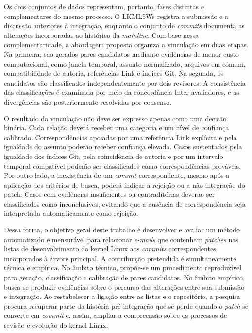 Os dois conjuntos de dados representam, portanto, fases distintas e complementares do mesmo processo. O LKML5Ws registra a submissão e a discussão anteriores à integração, enquanto o conjunto de \textit{commits} documenta as alterações incorporadas ao histórico da \textit{mainline}. Com base nessa complementaridade, a abordagem proposta organiza a vinculação em duas etapas. Na primeira, são gerados pares candidatos mediante evidências de menor custo computacional, como janela temporal, assunto normalizado, arquivos em comum, compatibilidade de autoria, referências Link e índices Git. Na segunda, os candidatos são classificados independentemente por dois revisores. A consistência das classificações é examinada por meio da concordância Inter avaliadores, e as divergências são posteriormente resolvidas por consenso.

O resultado da vinculação não deve ser expresso apenas como uma decisão binária. Cada relação deverá receber uma categoria e um nível de confiança calibrado. Correspondências apoiadas por uma referência Link explícita e pela igualdade do assunto poderão receber confiança elevada. Casos sustentados pela igualdade dos índices Git, pela coincidência de autoria e por um intervalo temporal compatível poderão ser classificados como correspondências prováveis. Por outro lado, a inexistência de um \textit{commit} correspondente, mesmo após a aplicação dos critérios de busca, poderá indicar a rejeição ou a não integração do patch. Casos com evidências insuficientes ou contraditórias deverão ser classificados como inconclusivos, evitando que a ausência de correspondência seja interpretada automaticamente como rejeição.

Dessa forma, o objetivo geral deste trabalho é desenvolver e avaliar um método automatizado e mensurável para relacionar \textit{e-mails} que contenham \textit{patches} nas listas de desenvolvimento do kernel Linux aos \textit{commits} correspondentes incorporados à árvore principal. A contribuição pretendida é simultaneamente técnica e empírica. No âmbito técnico, propõe-se um procedimento reproduzível para geração, classificação e calibração de pares candidatos. No âmbito empírico, busca-se produzir evidências sobre o percurso das alterações entre sua submissão e integração. Ao restabelecer a ligação entre as listas e o repositório, a pesquisa procura recuperar parte da história pré-integração que se perde quando o \textit{patch} se converte em \textit{commit} e, assim, ampliar a compreensão sobre os processos de revisão e evolução do kernel Linux.

